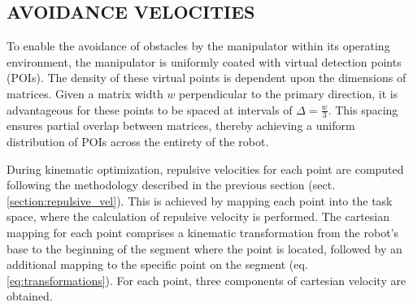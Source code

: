 \documentclass[letterpaper, 10 pt, conference]{ieeeconf}  %
\begin{document}
\subsection{AVOIDANCE VELOCITIES}


To enable the avoidance of obstacles by the manipulator within its operating environment, the manipulator is uniformly coated with virtual detection points (POIs). The density of these virtual points is dependent upon the dimensions of matrices. Given a matrix width $w$ perpendicular to the primary direction, it is advantageous for these points to be spaced at intervals of $\Delta = \frac{w}{3}$. This spacing ensures partial overlap between matrices, thereby achieving a uniform distribution of POIs across the entirety of the robot.

During kinematic optimization, repulsive velocities for each point are computed following the methodology described in the previous section (sect. \ref{section:repulsive_vel}). This is achieved by mapping each point into the task space, where the calculation of repulsive velocity is performed. The cartesian mapping for each point comprises a kinematic transformation from the robot's base to the beginning of the segment where the point is located, followed by an additional mapping to the specific point on the segment (eq. \ref{eq:transformations}).  For each point, three components of cartesian velocity are obtained.
\end{document}
